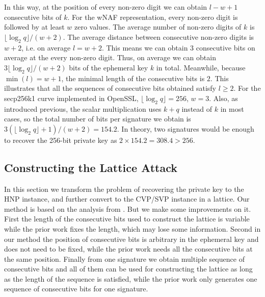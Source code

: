 In this way, at the position of every non-zero digit we can obtain $l - w + 1$ consecutive bits of $k$.
For the wNAF representation, every non-zero digit is followed by at least $w$ zero values.
 The average number of non-zero digits of $k$ is $\lfloor\log_{2}{q}\rfloor /(w+2)$.
 The average distance between consecutive non-zero digits is $w+2$, i.e. on average $l = w + 2$.
 This means we can obtain $3$ consecutive bits on average at the every non-zero digit.
Thus, on average we can obtain $3\lfloor\log_{2}{q}\rfloor /(w+2)$ bits of the ephemeral key $k$ in total.
Meanwhile, because $\min(l) = w + 1$, the minimal length of the consecutive bits is $2$.
This illustrates that all the sequences of consecutive bits obtained satisfy $l \geq 2$.
For the secp256k1 curve implemented in OpenSSL, $\lfloor\log_{2}{q}\rfloor = 256$, $w = 3$.
 Also, as introduced previous, the scalar multiplication uses $k+q$ instead of $k$ in most cases,
  so the total number of bits per signature we obtain is $3(\lfloor\log_{2}{q}\rfloor +1)/(w+2) = 154.2$.
In theory, two signatures would be enough to recover the 256-bit private key as $2\times 154.2 = 308.4 > 256$.


%


\subsection{Constructing the Lattice Attack}
\label{data_proc2}
In this section we transform the problem of recovering the private key to the HNP instance, and further convert to the CVP/SVP instance in a lattice.
Our method is based on the analysis from \cite{Nguyen2002}.
But we make some improvements on it.
First the length of the consecutive bits used to construct the lattice is variable while the prior work fixes the length, which may lose some information.
Second  in our method the position of consecutive bits is arbitrary in the ephemeral key and does not need to be fixed, while the prior work needs all the consecutive bits at the same position.
Finally from one signature we obtain multiple sequence of consecutive bits and all of them can be used for constructing the lattice as long as the length of the sequence is satisfied, while the prior work only generates one sequence of consecutive bits for one signature.

